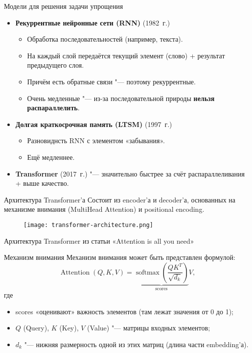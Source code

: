 \begin{frame}[fragile]{Модели для решения задачи упрощения}%
  \begin{itemize}%
    \item \textbf{Рекуррентные нейронные сети (RNN)} (1982~г.)
      \begin{itemize}%
         \item Обработка последовательностей (например, текста).
         \item На каждый слой передаётся текущий элемент (слово) + результат предыдущего слоя.
         \item Причём есть обратные связи "--- поэтому рекуррентные.
         \item Очень медленные "--- из-за последовательной природы \textbf{нельзя распараллелить}.
       \end{itemize} 
    \item \textbf{Долгая краткосрочная память (LTSM)} (1997~г.)
      \begin{itemize}%
        \item Разновиднсть RNN с элементом «забывания».
        \item Ещё медленнее.
      \end{itemize}
    \item \textbf{Transformer} (2017~г.) "--- значительно быстрее за счёт распараллеливания + выше качество.
  \end{itemize}
\end{frame}


\begin{frame}[fragile]{Архитектура Transformer'а}%
  Состоит из encoder'а и decoder'а, основанных на механизме внимания (MultiHead Attention) и positional encoding.
  \begin{figure}[H]%
    \centering
    \texttt{[image: transformer-architecture.png]}
    \label{transformer-architecture}
  \end{figure}
  \begin{center}%
    \tiny Архитектура Transformer из статьи «Attention is all you need»
  \end{center}
\end{frame}


\begin{frame}[fragile]{Механизм внимания}%
  Механизм внимания может быть представлен формулой:
  \begin{equation}\label{scaled-dot-product-attention}%
    \operatorname{Attention}(Q, K, V) = \underbrace{
      \operatorname{softmax}\left(
        \frac{QK^T}{\sqrt{d_k}}
      \right)
    }_{\text{scores}}
    V,
  \end{equation}
  где
  \begin{itemize}%
    \item scores «оценивают» важность элементов (там лежат значения от 0 до 1);
    \item $Q$ (Query), $K$ (Key), $V$ (Value) "--- матрицы входных элементов;
    \item $d_k$ "--- нижняя размерность одной из этих матриц (длина части embedding'а).
  \end{itemize}
\end{frame}


